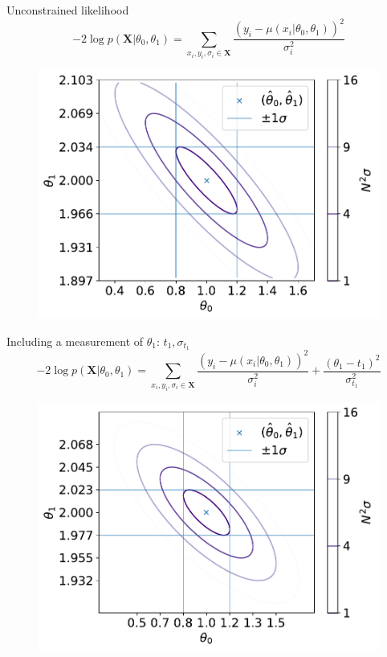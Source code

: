 \documentclass[
aspectratio=169,
14pt,
professionalfonts
]{beamer}
\begin{document}
\begin{frame}{Unconstrained likelihood}
\vspace{-1cm}
    $$ -2\log p(\boldsymbol{X}|\theta_0, \theta_1) = \sum_{x_i, y_i,\sigma_i \in \boldsymbol{X}}\frac{\left(y_i -\mu(x_i|\theta_0, \theta_1)\right)^2}{\sigma_i^2}$$
    \begin{figure}
        \centering
        \includegraphics[width=0.5\linewidth]{../plots/nll_unconstr.pdf}
    \end{figure}
\end{frame}

\begin{frame}{Including a measurement of $\theta_1$: $t_1, \sigma_{t_1}$}
\vspace{-1cm}
    $$ -2\log p(\boldsymbol{X}|\theta_0, \theta_1) = \sum_{x_i, y_i,\sigma_i \in \boldsymbol{X}}\frac{\left(y_i -\mu(x_i|\theta_0, \theta_1)\right)^2}{\sigma_i^2} + \frac{\left(\theta_1 -t_1\right)^2}{\sigma_{t_1}^2} $$
    \begin{figure}
        \centering
        \includegraphics[width=0.5\linewidth]{../plots/nll_constr.pdf}
    \end{figure}
\end{frame}
\end{document}
